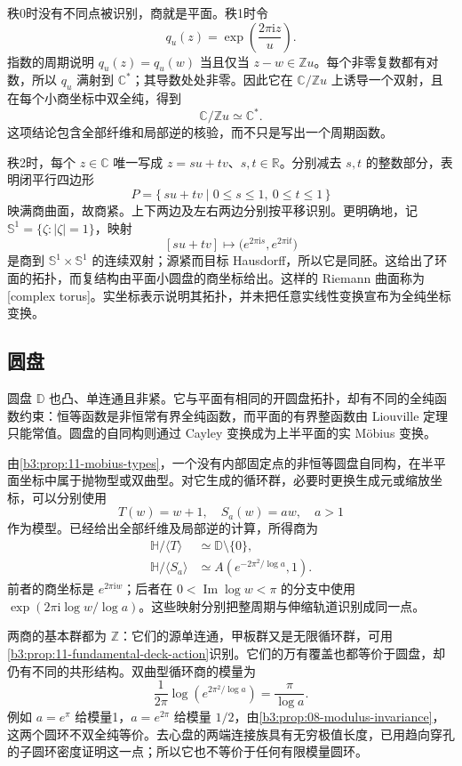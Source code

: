 \ProseParagraphBreak
秩0时没有不同点被识别，商就是平面。秩1时令
\[
 q_u(z)=\exp\left(\frac{2\pi\mathrm i z}{u}\right).
\]
指数的周期说明 \(q_u(z)=q_u(w)\) 当且仅当 \(z-w\in\mathbb Zu\)。每个非零复数都有对数，所以 \(q_u\) 满射到 \(\mathbb C^*\)；其导数处处非零。因此它在 \(\mathbb C/\mathbb Zu\) 上诱导一个双射，且在每个小商坐标中双全纯，得到
\[
 \mathbb C/\mathbb Zu\simeq\mathbb C^*.
\]
这项结论包含全部纤维和局部逆的核验，而不只是写出一个周期函数。

\ProseParagraphBreak
秩2时，每个 \(z\in\mathbb C\) 唯一写成 \(z=su+tv\)、\(s,t\in\mathbb R\)。分别减去 \(s,t\) 的整数部分，表明闭平行四边形
\[
 P=\{\,su+tv\mid0\le s\le1,\ 0\le t\le1\,\}
\]
映满商曲面，故商紧。上下两边及左右两边分别按平移识别。更明确地，记 \(\mathbb S^1=\{\zeta:|\zeta|=1\}\)，映射
\[
 [su+tv]\longmapsto
 \bigl(e^{2\pi\mathrm i s},e^{2\pi\mathrm i t}\bigr)
\]
是商到 \(\mathbb S^1\times\mathbb S^1\) 的连续双射；源紧而目标 Hausdorff，所以它是同胚。这给出了环面的拓扑，而复结构由平面小圆盘的商坐标给出。这样的 Riemann 曲面称为[complex torus]。实坐标表示说明其拓扑，并未把任意实线性变换宣布为全纯坐标变换。

\subsection{圆盘}
\label{b3:subsec:120103}

圆盘 \(\mathbb D\) 也凸、单连通且非紧。它与平面有相同的开圆盘拓扑，却有不同的全纯函数约束：恒等函数是非恒常有界全纯函数，而平面的有界整函数由 Liouville 定理只能常值。圆盘的自同构则通过 Cayley 变换成为上半平面的实 Möbius 变换。

\ProseParagraphBreak
由\cref{b3:prop:11-mobius-types}，一个没有内部固定点的非恒等圆盘自同构，在半平面坐标中属于抛物型或双曲型。对它生成的循环群，必要时更换生成元或缩放坐标，可以分别使用
\[
 T(w)=w+1,\quad S_a(w)=aw,\quad a>1
\]
作为模型。已经给出全部纤维及局部逆的计算，所得商为
\[
 \begin{aligned}
 \mathbb H/\langle T\rangle
 &\simeq\mathbb D\setminus\{0\},\\
 \mathbb H/\langle S_a\rangle
 &\simeq A\left(e^{-2\pi^2/\log a},1\right).
 \end{aligned}
\]
前者的商坐标是 \(e^{2\pi\mathrm i w}\)；后者在 \(0<\operatorname{Im}\log w<\pi\) 的分支中使用 \(\exp(2\pi\mathrm i\log w/\log a)\)。这些映射分别把整周期与伸缩轨道识别成同一点。

\ProseParagraphBreak
两商的基本群都为 \(\mathbb Z\)：它们的源单连通，甲板群又是无限循环群，可用\cref{b3:prop:11-fundamental-deck-action}识别。它们的万有覆盖也都等价于圆盘，却仍有不同的共形结构。双曲型循环商的模量为
\[
 \frac1{2\pi}\log\left(e^{2\pi^2/\log a}\right)
 =\frac{\pi}{\log a}.
\]
例如 \(a=e^\pi\) 给模量1，\(a=e^{2\pi}\) 给模量 \(1/2\)，由\cref{b3:prop:08-modulus-invariance}，这两个圆环不双全纯等价。去心盘的两端连接族具有无穷极值长度，已用趋向穿孔的子圆环密度证明这一点；所以它也不等价于任何有限模量圆环。

